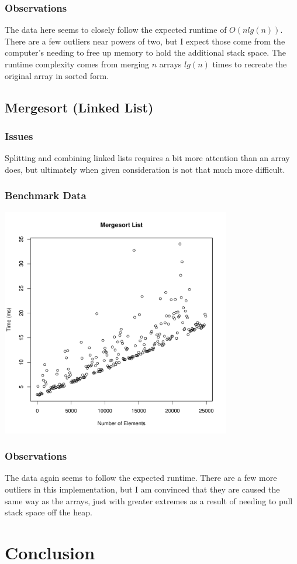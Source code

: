 \documentclass[a4paper,12pt]{article}
\begin{document}
\subsubsection{Observations}
The data here seems to closely follow the expected runtime of $O(nlg(n))$. There are a few outliers near powers of two, but I expect those come from the computer's needing
to free up memory to hold the additional stack space. The runtime complexity comes from merging $n$ arrays $lg(n)$ times to recreate the original array in sorted form.
\subsection{Mergesort (Linked List)}
\subsubsection{Issues}
Splitting and combining linked lists requires a bit more attention than an array does, but ultimately when given consideration is not that much more difficult.
\subsubsection{Benchmark Data}
\includegraphics[height=10cm]{mergesort_list}
\subsubsection{Observations}
The data again seems to follow the expected runtime. There are a few more outliers in this implementation, but I am convinced that they are caused the same way as
the arrays, just with greater extremes as a result of needing to pull stack space off the heap.
\section{Conclusion}
\end{document}
